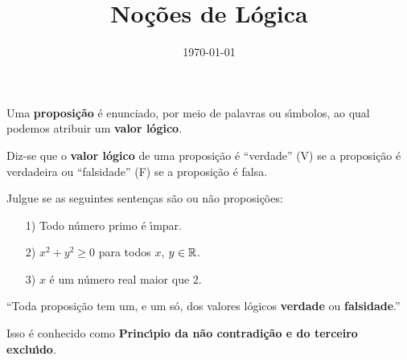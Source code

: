 \documentclass{beamer}
\title{No\c{c}\~oes de L\'ogica}
\author[\autor]{\autor}
\institute[\instituto]{\instituto}
\date{\today}
\begin{document}
    \begin{frame}
        \maketitle
    \end{frame}


    \begin{frame}
        \begin{definicao}
            Uma \textbf{proposi\c{c}\~ao} \'e enunciado, por meio de palavras ou s{\'\i}mbolos, ao qual podemos atribuir um \textbf{valor l\'ogico}.\pause
        \end{definicao}

        \begin{definicao}
            Diz-se que o \textbf{valor l\'ogico} de uma proposi\c{c}\~ao \'e ``verdade'' (V) se a proposi\c{c}\~ao \'e verdadeira ou ``falsidade'' (F) se a proposi\c{c}\~ao \'e falsa.
        \end{definicao}
    \end{frame}

    \begin{frame}
        \begin{exemplos}
            Julgue se as seguintes senten\c{c}as s\~ao ou n\~ao proposi\c{c}\~oes:\pause
            \begin{itemize}
                \item[1)] Todo n\'umero primo \'e {\'\i}mpar.\pause
                \item[2)] $x^2 + y^2 \ge 0$ para todos $x$, $y \in \mathbb{R}$.\pause
                \item[3)] $x$ \'e um n\'umero real maior que 2.
            \end{itemize}
        \end{exemplos}
    \end{frame}

    \begin{frame}
        \begin{center}
            ``Toda proposi\c{c}\~ao tem um, e um s\'o, dos valores l\'ogicos \textbf{verdade} ou \textbf{falsidade}.''\pause
        \end{center}
        Isso \'e conhecido como \textbf{Princ{\'\i}pio da n\~ao contradi\c{c}\~ao e do terceiro exclu{\'\i}do}.
    \end{frame}
\end{document}
